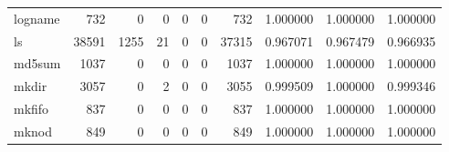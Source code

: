 \begin{tabular}{lrrrrrrrrr}
logname   &                                                732 &                                                  0 &                                                  0 &                                                  0 &                                                  0 &                                                732 &                                           1.000000 &                               1.000000 &                             1.000000 \\
ls        &                                              38591 &                                               1255 &                                                 21 &                                                  0 &                                                  0 &                                              37315 &                                           0.967071 &                               0.967479 &                             0.966935 \\
md5sum    &                                               1037 &                                                  0 &                                                  0 &                                                  0 &                                                  0 &                                               1037 &                                           1.000000 &                               1.000000 &                             1.000000 \\
mkdir     &                                               3057 &                                                  0 &                                                  2 &                                                  0 &                                                  0 &                                               3055 &                                           0.999509 &                               1.000000 &                             0.999346 \\
mkfifo    &                                                837 &                                                  0 &                                                  0 &                                                  0 &                                                  0 &                                                837 &                                           1.000000 &                               1.000000 &                             1.000000 \\
mknod     &                                                849 &                                                  0 &                                                  0 &                                                  0 &                                                  0 &                                                849 &                                           1.000000 &                               1.000000 &                             1.000000 \\

\end{tabular}
